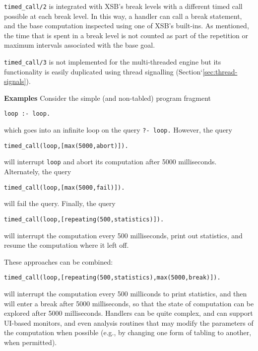 \begin{description}
{\tt timed\_call/2} is integrated with XSB's break levels with a
different timed call possible at each break level.  In this way, a
handler can call a break statement, and the base computation inspected
using one of XSB's built-ins.  As mentioned, the time that is spent in
a break level is not counted as part of the repetition or maximum intervals associated with the base goal.

{\tt timed\_call/3} is not implemented for the multi-threaded engine
but its functionality is easily duplicated using thread signalling
(Section`\ref{sec:thread-signals}).

{\bf Examples}
Consider the simple (and non-tabled) program fragment
\begin{verbatim}
loop :- loop.
\end{verbatim}
which goes into an infinite loop on the query {\tt ?- loop.}  However,
the query
\begin{verbatim}
timed_call(loop,[max(5000,abort)]).
\end{verbatim}
will interrupt {\tt loop} and abort its computation after 5000
milliseconds.  Alternately, the query
\begin{verbatim}
timed_call(loop,[max(5000,fail)]).
\end{verbatim}
will fail the query.  Finally, the query
\begin{verbatim}
timed_call(loop,[repeating(500,statistics)]).
\end{verbatim}
will interrupt the computation every 500 milliseconds, print out
statistics, and resume the computation where it left off.

These approaches can be combined: 
\begin{verbatim}
timed_call(loop,[repeating(500,statistics),max(5000,break)]).
\end{verbatim}
will interrupt the computation every 500 milliconds to print
statistics, and then will enter a break after 5000 milliseconds, so
that the state of computation can be explored after 5000 milliseconds.
Handlers can be quite complex, and can support UI-based monitors, and
even analysis routines that may modify the parameters of the
computation when possible (e.g., by changing one form of tabling to
another, when permitted).


\end{description}
